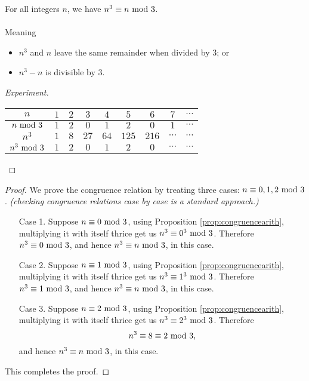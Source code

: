 \begin{example}
For all integers $n$, we have $n^3 \equiv n \text{ mod }{3}$.\\
\\
Meaning
\begin{itemize}
\item $n^3$ and $n$ leave the same remainder when divided by $3$; or
\item $n^3 - n$ is divisible by $3$.
\end{itemize}
\end{example}
\begin{proof}[Experiment]\hfill
\renewcommand{\qed}{}
\begin{center}
{\renewcommand{\arraystretch}{1.5}%
\begin{tabular}{c|cccccccc}
$n$ & $1$ & $2$ & $3$ & $4$ & $5$ & $6$ & $7$ & $\cdots$\\
\hline
$n \text{ mod }{3}$ & $1$ & $2$ & $0$ & $1$ & $2$ & $0$ & $1$ & $\cdots$\\
\hline
$n^3$ & $1$ & $8$ & $27$ & $64$ & $125$ & $216$ & $\cdots$ & $\cdots$\\
\hline
$n^3\text{ mod }{3}$ & $1$ & $2$ & $0$ & $1$ & $2$ & $0$ & $\cdots$ & $\cdots$
\end{tabular}
}
\end{center}
\end{proof}
\begin{proof}
We prove the congruence relation by treating three cases: $n \equiv 0,1,2 \text{ mod }{3}$. \emph{(checking congruence relations case by case is a standard approach.)}
\begin{itemize}[leftmargin=4em]
\item[Case 1.] Suppose $n \equiv 0 \text{ mod }{3}$, using Proposition \ref{prop:congruencearith}, multiplying it with itself thrice get us $n^3 \equiv 0^3 \text{ mod }{3}$. Therefore $n^3 \equiv 0 \text{ mod }{3}$, and hence $n^3 \equiv n \text{ mod }{3}$, in this case. 
\item[Case 2.] Suppose $n \equiv 1 \text{ mod }{3}$, using Proposition \ref{prop:congruencearith}, multiplying it with itself thrice get us $n^3 \equiv 1^3 \text{ mod }{3}$. Therefore $n^3 \equiv 1 \text{ mod }{3}$, and hence $n^3 \equiv n \text{ mod }{3}$, in this case. 
\item[Case 3.] Suppose $n \equiv 2 \text{ mod }{3}$, using Proposition \ref{prop:congruencearith}, multiplying it with itself thrice get us $n^3 \equiv 2^3 \text{ mod }{3}$. Therefore \[n^3 \equiv 8 \equiv 2 \text{ mod }{3},\] and hence $n^3 \equiv n \text{ mod }{3}$, in this case. 
\end{itemize}
This completes the proof.
\end{proof}

